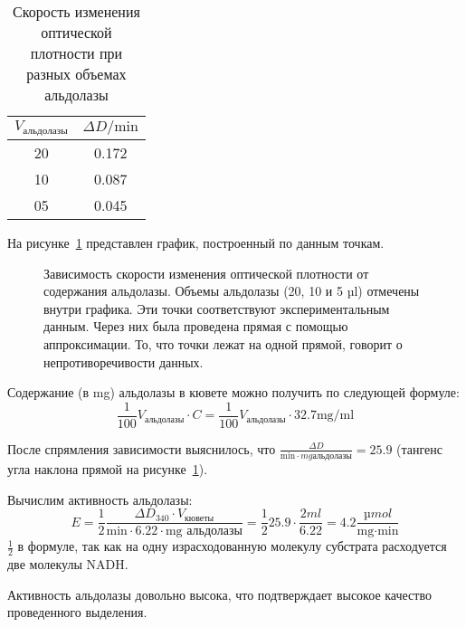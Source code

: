 \begin{table}[htbp]
\caption[Скорость изменения оптической плотности]
    {Скорость изменения оптической плотности при разных объемах альдолазы}
\begin{tabular}{|c|c|}
\hline
$ V_{\text{альдолазы}} $ & $ \Delta D / \text{min} $ \\
\hline
20 & 0.172 \\
10 & 0.087 \\
05 & 0.045 \\
\hline
\end{tabular}
\label{table-ald-to-delta-d-min}
\end{table}

На рисунке~\ref{act-v-to-delta-d} представлен график,
построенный по данным точкам.

\begin{figure}[htbp]

\caption[Зависимость скорости от содержания альдолазы]
    {Зависимость скорости изменения оптической плотности от содержания альдолазы.
    Объемы альдолазы (20, 10 и 5 µl) отмечены внутри графика.
    Эти точки соответствуют экспериментальным данным.
    Через них была проведена прямая с помощью аппроксимации.
    То, что точки лежат на одной прямой, говорит о непротиворечивости данных.}
\label{act-v-to-delta-d}
\end{figure}

Содержание (в mg) альдолазы в кювете можно получить по следующей формуле:
$$ \frac{1}{100} V_\text{альдолазы} \cdot C =
   \frac{1}{100} V_\text{альдолазы} \cdot 32.7 \text{mg/ml} $$

После спрямления зависимости выяснилось, что
$\frac{\Delta D}{\text{min} \cdot {mg альдолазы}} = 25.9$
(тангенс угла наклона прямой на рисунке~\ref{act-v-to-delta-d}).

Вычислим активность альдолазы:
$$ E = \frac{1}{2} \frac{\Delta D_{340} \cdot V_{кюветы}}{\text{min} \cdot 6.22 \cdot \text{mg альдолазы}} =
    \frac{1}{2} 25.9 \cdot \frac{2 ml}{6.22} = 4.2 \frac{µmol}{\text{mg} \cdot \text{min}} $$
$\frac{1}{2}$ в формуле, так как на одну израсходованную молекулу субстрата
расходуется две молекулы NADH.

Активность альдолазы довольно высока, что подтверждает высокое качество
проведенного выделения.

